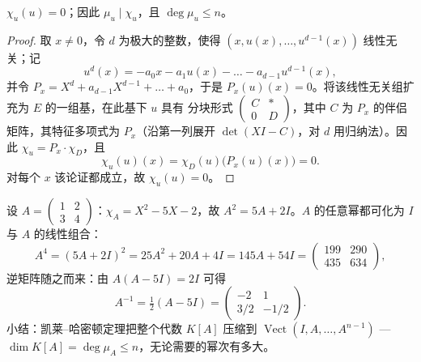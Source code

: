 \begin{theorem}[凯莱--哈密顿]\label{thm:b2:reduction:cayleyhamilton}
$\chi_u(u) = 0$；因此 $\mu_u \mid \chi_u$，且 $\deg \mu_u
\leq n$。
\end{theorem}

\begin{proof}
取 $x \neq 0$，令 $d$ 为极大的整数，使得 $(x, u(x), \dots,
u^{d-1}(x))$ 线性无关；记
\[
u^d(x) = -a_0 x - a_1 u(x) - \dots - a_{d-1}u^{d-1}(x),
\]
并令 $P_x = X^d + a_{d-1}X^{d-1} + \dots + a_0$，于是 $P_x(u)(x) =
0$。将该线性无关组扩充为 $E$ 的一组基，在此基下 $u$ 具有
分块形式 $\begin{pmatrix} C & \ast\\ 0 & D\end{pmatrix}$，其中 $C$
为 $P_x$ 的伴侣矩阵，其特征多项式为
$P_x$（沿第一列展开 $\det(XI - C)$，对
$d$ 用归纳法）。因此 $\chi_u = P_x \cdot \chi_D$，且
\[
\chi_u(u)(x) = \chi_D(u)\bigl(P_x(u)(x)\bigr) = 0 .
\]
对每个 $x$ 该论证都成立，故 $\chi_u(u) = 0$。
\end{proof}

\begin{example}[凯莱--哈密顿定理的应用]\label{ex:b2:reduction:chwork}
设 $A = \begin{pmatrix} 1 & 2\\ 3 & 4\end{pmatrix}$：$\chi_A = X^2 -
5X - 2$，故 $A^2 = 5A + 2I$。$A$ 的任意幂都可化为
$I$ 与 $A$ 的线性组合：
\[
A^4 = (5A + 2I)^2 = 25A^2 + 20A + 4I = 145A + 54I =
\begin{pmatrix} 199 & 290\\ 435 & 634\end{pmatrix},
\]
逆矩阵随之而来：由 $A(A - 5I) = 2I$ 可得
\[
A^{-1} = \tfrac12(A - 5I)
= \begin{pmatrix} -2 & 1\\ 3/2 & -1/2\end{pmatrix}.
\]
小结：凯莱--哈密顿定理把整个代数
$K[A]$ 压缩到 $\operatorname{Vect}(I, A, \dots, A^{n-1})$ ---
$\dim K[A] = \deg\mu_A \leq n$，无论需要的幂次有多大。
\end{example}

